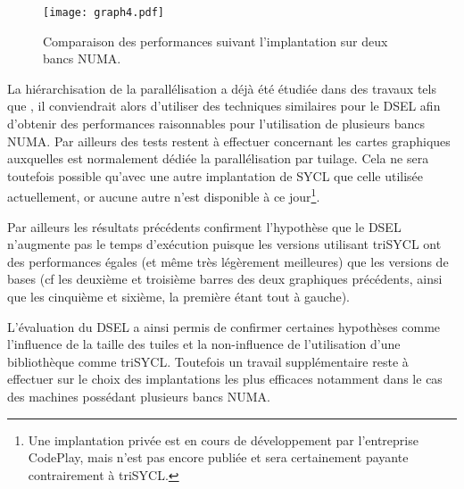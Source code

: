 \begin{figure}[!h]
  \caption{Comparaison des performances suivant l'implantation sur deux bancs NUMA.}
  \label{graph:comp_temps_mistral20core}
  \texttt{[image: graph4.pdf]}
\end{figure}

La hiérarchisation de la parallélisation a déjà été étudiée dans des travaux tels que \cite{Ths3,Ths4}, il conviendrait alors d'utiliser des techniques similaires pour le DSEL afin d'obtenir des performances raisonnables pour l'utilisation de plusieurs bancs NUMA. Par ailleurs des tests restent à effectuer concernant les cartes graphiques auxquelles est normalement dédiée la parallélisation par tuilage. Cela ne sera toutefois possible qu'avec une autre implantation de \textsf{SYCL} que celle utilisée actuellement, or aucune autre n'est disponible à ce jour\footnote{Une implantation privée est en cours de développement par l'entreprise \textsf{CodePlay}, mais n'est pas encore publiée et sera certainement payante contrairement à \textsf{triSYCL}.}.

Par ailleurs les résultats précédents confirment l'hypothèse que le DSEL n'augmente pas le temps d'exécution puisque les versions utilisant \textsf{triSYCL} ont des performances égales (et même très légèrement meilleures) que les versions de bases (cf les deuxième et troisième barres des deux graphiques précédents, ainsi que les cinquième et sixième, la première étant tout à gauche).

L'évaluation du DSEL a ainsi permis de confirmer certaines hypothèses comme l'influence de la taille des tuiles et la non-influence de l'utilisation d'une bibliothèque comme \textsf{triSYCL}. Toutefois un travail supplémentaire reste à effectuer sur le choix des implantations les plus efficaces notamment dans le cas des machines possédant plusieurs bancs NUMA.
